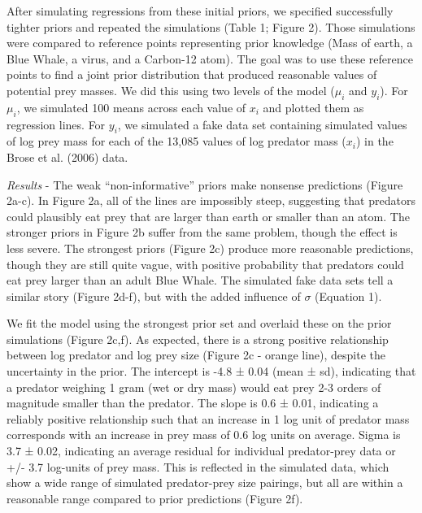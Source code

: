 \documentclass[
  12pt,
]{article}
\begin{document}
After simulating regressions from these initial priors, we specified
successfully tighter priors and repeated the simulations (Table 1;
Figure 2). Those simulations were compared to reference points
representing prior knowledge (Mass of earth, a Blue Whale, a virus, and
a Carbon-12 atom). The goal was to use these reference points to find a
joint prior distribution that produced reasonable values of potential
prey masses. We did this using two levels of the model (\(\mu_i\) and
\(y_i\)). For \(\mu_i\), we simulated 100 means across each value of
\(x_i\) and plotted them as regression lines. For \(y_i\), we simulated
a fake data set containing simulated values of log prey mass for each of
the 13,085 values of log predator mass (\(x_i\)) in the Brose et al.
(2006) data.

\emph{Results} - The weak ``non-informative'' priors make nonsense
predictions (Figure 2a-c). In Figure 2a, all of the lines are impossibly
steep, suggesting that predators could plausibly eat prey that are
larger than earth or smaller than an atom. The stronger priors in Figure
2b suffer from the same problem, though the effect is less severe. The
strongest priors (Figure 2c) produce more reasonable predictions, though
they are still quite vague, with positive probability that predators
could eat prey larger than an adult Blue Whale. The simulated fake data
sets tell a similar story (Figure 2d-f), but with the added influence of
\(\sigma\) (Equation 1).

We fit the model using the strongest prior set and overlaid these on the
prior simulations (Figure 2c,f). As expected, there is a strong positive
relationship between log predator and log prey size (Figure 2c - orange
line), despite the uncertainty in the prior. The intercept is -4.8 ±
0.04 (mean ± sd), indicating that a predator weighing 1 gram (wet or dry
mass) would eat prey 2-3 orders of magnitude smaller than the predator.
The slope is 0.6 ± 0.01, indicating a reliably positive relationship
such that an increase in 1 log unit of predator mass corresponds with an
increase in prey mass of 0.6 log units on average. Sigma is 3.7 ± 0.02,
indicating an average residual for individual predator-prey data or +/-
3.7 log-units of prey mass. This is reflected in the simulated data,
which show a wide range of simulated predator-prey size pairings, but
all are within a reasonable range compared to prior predictions (Figure
2f).
\end{document}
